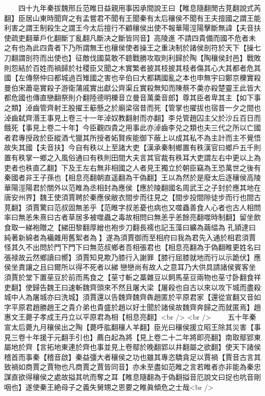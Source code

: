 　　四十九年秦拔魏邢丘范睢日益親用事因承間說王曰【睢息隨翻閒古莧翻說式芮翻】臣居山東時聞齊之有孟嘗君不聞有王聞秦有太后穰侯不聞有王夫擅國之謂王能利害之謂王制殺生之謂王今太后擅行不顧穰侯出使不報華陽涇陽擊斷無諱【夫音扶使疏吏翻華戶化翻斷丁亂翻凡斷决之斷皆同音】高陵進不請四貴備而國不危者未之有也為此四貴者下乃所謂無王也穰侯使者操王之重決制於諸侯剖符於天下【操七刀翻謂剖符而出使也】征敵伐國莫敢不聼戰勝攻取則利歸於陶【陶穰侯封邑】戰敗則怨結於百姓而禍歸於社稷臣又聞之木實繁者披其枝披其枝者傷其心大其都者危其國【左傳祭仲曰都城過百雉國之害也辛伯曰大都耦國亂之本也申無宇曰鄭京櫟實殺曼伯宋蕭亳實殺子游衛蒲戚實出獻公齊渠丘實殺無知而陳蔡不羮亦殺楚靈王此皆大都危國也傳直戀翻祭則介翻陸德明櫟音立曼音萬羮音郎】尊其臣者卑其主【如下事之類】淖齒管齊射王股擢王䈥懸之於廟梁宿昔而死【管掌也擢拔也宿昔一夕之間也淖齒弑齊湣王事見上卷三十一年淖奴教翻射而亦翻】李兑管趙囚主父於沙丘百日而餓死【事見上卷二十年】今臣觀四貴之用事此亦淖齒李兑之類也夫三代之所以亡國者君專授政於臣縱酒弋獵其所授者妬賢疾能御下蔽上以成其私不為主計而主不覺悟故失其國【夫音扶】今自有秩以上至諸大吏【漢承秦制鄉置有秩漢官曰鄉戶五千則置有秩掌一鄉之入風俗通曰有秩則田間大夫言其官裁有秩耳大吏謂左右中更以上為吏者也秩直乙翻】下及王左右無非相國之人者見王獨立於朝臣竊為王恐萬世之後有秦國者非王子孫也【相息亮翻朝直遥翻為干偽翻】王以為然於是廢太后逐穰侯高陵華陽涇陽君於關外以范睢為丞相封為應侯【應於陵翻國名周武王之子封於應其地在唐安州界】魏王使須賈聘於秦應侯敝衣間步而往見之【間步投間隙徒步而行也間古莧翻】須賈驚曰范叔固無恙乎【范睢字叔恙憂也病也又噬蟲善食人心者也古人相問率曰無恙朱熹曰古者草居多被噬蟲之毒故相問曰無恙乎恙餘亮翻噬時制翻】留坐飲食取一綈袍贈之【綈田黎翻厚繒也袍步刀翻長襦也記玉藻曰纊為繭緼為孔頴達曰純著新綿者為襺雜用舊絮者為】遂為須賈御而至相府曰我為君先入通於相君須賈怪其久不出問於門下門下曰無范叔鄉者吾相張君也【相息亮翻為于偽翻睢更姓名曰張禄故云然鄉讀曰嚮】須賈知見欺乃膝行入謝罪【膝行屈膝就地而行以示跪伏】應侯坐責讓之且曰爾所以得不死者以綈戀戀尚有故人之意耳乃大供具請諸侯賓客坐須賈於堂下置莝豆於前而馬食之【莝寸斬之藁雜豆以飼馬莝豆兩物也莝寸卧翻食祥吏翻】使歸告魏王曰速斬魏齊頭來不然且屠大梁【屠殺也自古以來以攻下城而盡殺城中人為屠城亦曰洗城】須賈還以告魏齊魏齊犇趙匿於平原君家【還從宣翻又音如字平原君趙勝趙王之貴介弟也貴盛於趙以好士聞於諸侯故魏齊奔歸之而就匿焉】趙惠文王薨子孝成王丹立以平原君為相【相息亮翻】<br />
<br />
　　五十年秦宣太后薨九月穰侯出之陶【薨呼肱翻穰人羊翻】臣光曰穰侯援立昭王除其災害【事見三卷十年援于元翻手引也】薦白起為將【見上卷二十二年將即亮翻】南取鄢郢東屬地於齊【言拓地東連於齊也事並見上卷鄢於晚翻郢以井翻屬之欲翻】使天下諸侯稽首而事秦【稽音啟】秦益彊大者穰侯之功也雖其專恣驕貪足以賈禍【賈音古言其致禍如商賈之賈物也凡商賈之賈皆同音】亦未至盡如范睢之言若睢者亦非能為秦忠謀直欲得穰侯之處故搤其吭而奪之耳【睢息隨翻為于偽翻搤音厄說文曰捉也吭音剛咽也】遂使秦王絶母子之義失舅甥之恩要之睢眞傾危之士哉<br />
